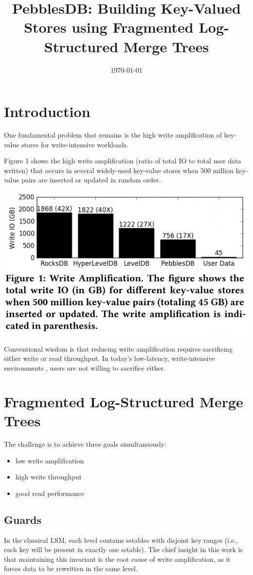 \documentclass[11pt]{article}
\date{\today}
\title{PebblesDB: Building Key-Valued Stores using Fragmented Log-Structured Merge Trees}
\begin{document}
\maketitle
\section{Introduction}
\label{sec:org69d58c4}
One fundamental problem that remains is the high write amplification of key-value stores for
write-intensive workloads.


Figure 1 shows the high write amplification (ratio of total IO to total user data written) that occurs
in several widely-used key-value stores when 500 million key-value pairs are inserted or updated in
random order.

\begin{center}
\includegraphics[width=.7\textwidth]{../../images/papers/121.png}
\label{f1}
\end{center}

Conventional wisdom is that reducing write amplification requires sacrificing either write or read
throughput. In today’s low-latency, write-intensive environments , users are not willing to sacrifice
either.
\section{Fragmented Log-Structured Merge Trees}
\label{sec:orgb41d256}
The challenge is to achieve three goals simultaneously:
\begin{itemize}
\item low write amplification
\item high write throughput
\item good read performance
\end{itemize}
\subsection{Guards}
\label{sec:org9d9dc96}
In the classical LSM, each level contains sstables with disjoint key ranges (i.e., each key will be
present in exactly one sstable). The chief insight in this work is that maintaining this invariant is
the root cause of write amplification, as it forces data to be rewritten in the same level.
\end{document}

